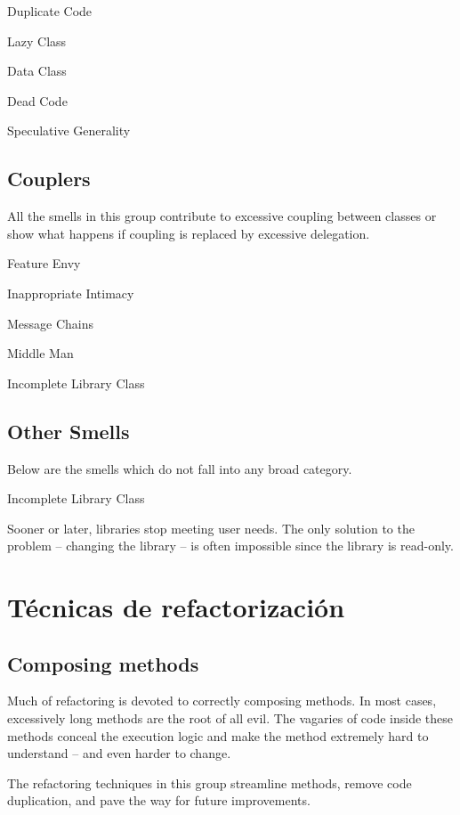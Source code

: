 \documentclass[11pt,a4paper,oneside]{book}
\begin{document}
    
    
    Duplicate Code
    
    Lazy Class

    Data Class

Dead Code

    Speculative Generality



\section{Couplers}

All the smells in this group contribute to excessive coupling between classes or show what happens if coupling is replaced by excessive delegation.

    Feature Envy
    
    Inappropriate Intimacy
    
    Message Chains
    
    Middle Man

    Incomplete Library Class


\section{Other Smells}

Below are the smells which do not fall into any broad category.

Incomplete Library Class

Sooner or later, libraries stop meeting user needs. The only solution to the problem – changing the library – is often impossible since the library is read-only.



\chapter{Técnicas de refactorización}


\section{Composing methods}

Much of refactoring is devoted to correctly composing methods. In most cases, excessively long methods are the root of all evil. The vagaries of code inside these methods conceal the execution logic and make the method extremely hard to understand – and even harder to change.

The refactoring techniques in this group streamline methods, remove code duplication, and pave the way for future improvements.
\end{document}
